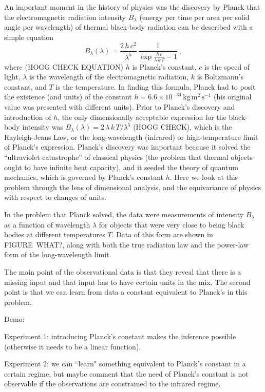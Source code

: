 \documentclass{article}
\newcommand{\unit}[1]{\mathrm{#1}}
\newcommand{\kg}{\unit{kg}}
\newcommand{\m}{\unit{m}}
\newcommand{\s}{\unit{s}}
\begin{document}
An important moment in the history of physics was the discovery by Planck \cite{planck} that the electromagnetic radiation intensity $B_\lambda$ (energy per time per area per solid angle per wavelength) of thermal black-body radiation can be described with a simple equation
\begin{equation}
    B_\lambda(\lambda) = \frac{2\,h\,c^2}{\lambda^5}\,\frac{1}{\exp\frac{h\,c}{\lambda\,k\,T} - 1}~,
\end{equation}
where (HOGG CHECK EQUATION)
$h$ is Planck's constant,
$c$ is the speed of light,
$\lambda$ is the wavelength of the electromagnetic radiation,
$k$ is Boltzmann's constant,
and $T$ is the temperature.
In finding this formula, Planck had to posit the existence (and units) of the constant $h=6.6\times 10^{-34}\,\kg\,\m^2\,\s^{-1}$ (his original value was presented with different units).
Prior to Planck's discovery and introduction of $h$, the only dimensionally acceptable expression for the black-body intensity was $B_\lambda(\lambda)=2\,\lambda\,k\,T/\lambda^5$ (HOGG CHECK), which is the Rayleigh-Jeans Law, or the long-wavelength (infrared) or high-temperature limit of Planck's expression.
Planck's discovery was important because it solved the ``ultraviolet catastrophe'' of classical physics (the problem that thermal objects ought to have infinite heat capacity), and it seeded the theory of quantum mechanics, which is governed by Planck's constant $h$.
Here we look at this problem through the lens of dimensional analysis, and the equivariance of physics with respect to changes of units.

In the problem that Planck solved, the data were measurements of intensity $B_\lambda$ as a function of wavelength $\lambda$ for objects that were very close to being black bodies at different temperatures $T$.
Data of this form are shown in FIGURE~WHAT?, along with both the true radiation law and the power-law form of the long-wavelength limit.

The main point of the observational data is that they reveal that there is a missing input and that input has to have certain units in the mix. The second point is that we can learn from data a constant equivalent to Planck's in this problem. 

Demo:

Experiment 1: introducing Planck's constant makes the inference possible (otherwise it needs to be a linear function). 

Experiment 2: we can ``learn" something equivalent to Planck's constant in a certain regime, but maybe comment that the need of Planck's constant is not observable if the observations are constrained to the infrared regime.
\end{document}
